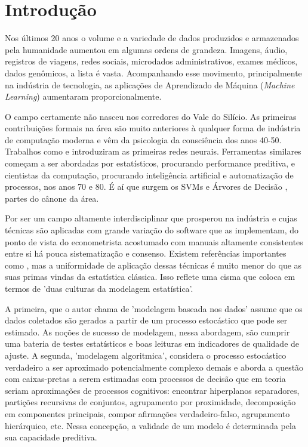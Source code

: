 

\chapter{Introdução}
\label{cap:intro} %



Nos últimos 20 anos o volume e a variedade de dados produzidos e armazenados pela humanidade aumentou em algumas ordens de grandeza.  Imagens, áudio, registros de viagens, redes sociais, microdados administrativos, exames médicos, dados genômicos, a lista é vasta. Acompanhando esse movimento, principalmente na indústria de tecnologia, as aplicações de Aprendizado de Máquina (\textit{Machine Learning}) aumentaram proporcionalmente.

O campo certamente não nasceu nos corredores do Vale do Silício. As primeiras contribuições formais na área são muito anteriores à qualquer forma de indústria de computação moderna e vêm da psicologia da consciência dos anos 40-50. Trabalhos como  e  introduziram as primeiras redes neurais. Ferramentas similares começam a ser abordadas por estatísticos, procurando performance preditiva, e cientistas da computação, procurando inteligência artificial e automatização de processos, nos anos 70 e 80. É aí que surgem os SVMs \cite{vapnik1974theory} e Árvores de Decisão \cite{breiman1984classification}, partes do cânone da área.

Por ser um campo altamente interdisciplinar que prosperou na indústria e cujas técnicas são aplicadas com grande variação do software que as implementam, do ponto de vista do econometrista acostumado com manuais altamente consistentes entre si há pouca sistematização e consenso. Existem referências importantes como , mas a uniformidade de aplicação dessas técnicas é muito menor do que as suas primas vindas da estatística clássica. Isso reflete uma cisma que  coloca em termos de 'duas culturas da modelagem estatística'. 

A primeira, que o autor chama de 'modelagem baseada nos dados' assume que os dados coletados são gerados a partir de um processo estocástico que pode ser estimado. As noções de sucesso de modelagem, nessa abordagem, são cumprir uma bateria de testes estatísticos e boas leituras em indicadores de qualidade de ajuste. A segunda, 'modelagem algoritmica', considera o processo estocástico verdadeiro a ser aproximado potencialmente complexo demais e aborda a questão com caixas-pretas a serem estimadas com processos de decisão que em teoria seriam aproximações de processos cognitivos: encontrar hiperplanos separadores, partições recursivas de conjuntos, agrupamento por proximidade, decomposição em componentes principais, compor afirmações verdadeiro-falso, agrupamento hierárquico, etc. Nessa concepção, a validade de um modelo é determinada pela sua capacidade preditiva. 

